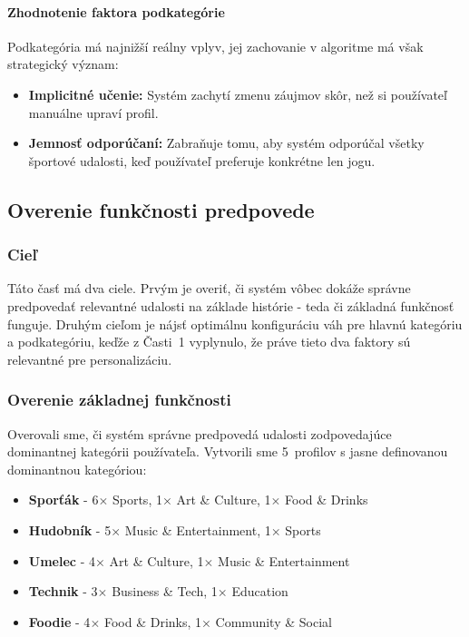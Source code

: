 \paragraph{Zhodnotenie faktora podkategórie}

Podkategória má najnižší reálny vplyv, jej zachovanie v algoritme má však
strategický význam:
\begin{itemize}[noitemsep, nolistsep]
    \item \textbf{Implicitné učenie:} Systém zachytí zmenu záujmov skôr, než si
    používateľ manuálne upraví profil.
    \item \textbf{Jemnosť odporúčaní:} Zabraňuje tomu, aby systém odporúčal všetky
    športové udalosti, keď používateľ preferuje konkrétne len jogu.
\end{itemize}

\subsection{Overenie funkčnosti predpovede}

\subsubsection{Cieľ}

Táto časť má dva ciele. Prvým je overiť, či systém vôbec dokáže správne predpovedať
relevantné udalosti na základe histórie - teda či základná funkčnosť funguje.
Druhým cieľom je nájsť optimálnu konfiguráciu váh pre hlavnú kategóriu a podkategóriu,
keďže z Časti~1 vyplynulo, že práve tieto dva faktory sú relevantné pre
personalizáciu.

\subsubsection{Overenie základnej funkčnosti}

Overovali sme, či systém správne predpovedá udalosti zodpovedajúce dominantnej
kategórii používateľa. Vytvorili sme 5~profilov s jasne definovanou dominantnou
kategóriou:

\begin{itemize}[noitemsep, nolistsep]
    \item \textbf{Sporťák} - 6$\times$ Sports, 1$\times$ Art \& Culture, 1$\times$ Food \& Drinks
    \item \textbf{Hudobník} - 5$\times$ Music \& Entertainment, 1$\times$ Sports
    \item \textbf{Umelec} - 4$\times$ Art \& Culture, 1$\times$ Music \& Entertainment
    \item \textbf{Technik} - 3$\times$ Business \& Tech, 1$\times$ Education
    \item \textbf{Foodie} - 4$\times$ Food \& Drinks, 1$\times$ Community \& Social
\end{itemize}


